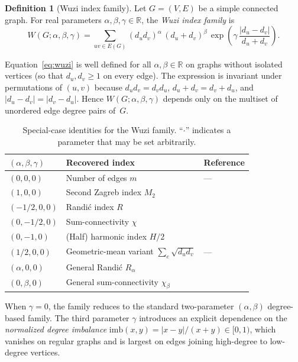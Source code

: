 \documentclass[11pt,a4paper]{article}
\theoremstyle{definition}
\newtheorem{definition}[theorem]{Definition}
\newcommand{\Wuzi}{W(G;\alpha,\beta,\gamma)}
\begin{document}
\begin{definition}[Wuzi index family]\label{def:wuzi}
Let $G=(V,E)$ be a simple connected graph. For real parameters
$\alpha,\beta,\gamma\in\mathbb{R}$, the \emph{Wuzi index family}
is
\begin{equation}\label{eq:wuzi}
\Wuzi
=\sum_{uv\in E(G)}
(d_u d_v)^{\alpha}\,(d_u+d_v)^{\beta}\,
\exp\!\left(\gamma\,\frac{|d_u-d_v|}{d_u+d_v}\right).
\end{equation}
\end{definition}

Equation~\eqref{eq:wuzi} is well defined for all $\alpha,\beta\in\mathbb{R}$
on graphs without isolated vertices (so that $d_u,d_v\ge 1$ on every
edge). The expression is invariant under permutations of $(u,v)$
because $d_u d_v=d_v d_u$, $d_u+d_v=d_v+d_u$, and
$|d_u-d_v|=|d_v-d_u|$. Hence $\Wuzi$ depends only on the multiset of
unordered edge degree pairs of~$G$.

\begin{table}[h]
\centering
\caption{Special-case identities for the Wuzi family. ``$\cdot$'' indicates a parameter that may be set arbitrarily.}
\label{tab:specialcases}
\begin{tabular}{lll}
\toprule
$(\alpha,\beta,\gamma)$ & Recovered index & Reference\\
\midrule
$(0,0,0)$ & Number of edges $m$ & ---\\
$(1,0,0)$ & Second Zagreb index $M_2$ & \cite{Gutman1972}\\
$(-1/2,0,0)$ & Randi\'c index $R$ & \cite{Randic1975}\\
$(0,-1/2,0)$ & Sum-connectivity $\chi$ & \cite{ZhouTrinajstic2009sumconn}\\
$(0,-1,0)$ & (Half) harmonic index $H/2$ & \cite{Fajtlowicz1987Harmonic}\\
$(1/2,0,0)$ & Geometric-mean variant $\sum_e\sqrt{d_ud_v}$ & ---\\
$(\alpha,0,0)$ & General Randi\'c $R_\alpha$ & \cite{BollobasErdos1998}\\
$(0,\beta,0)$ & General sum-connectivity $\chi_\beta$ & \cite{ZhouTrinajstic2009sumconn}\\
\bottomrule
\end{tabular}
\end{table}

When $\gamma=0$, the family reduces to the standard two-parameter
$(\alpha,\beta)$ degree-based family. The third parameter
$\gamma$ introduces an explicit dependence on the
\emph{normalized degree imbalance}
\(\mathrm{imb}(x,y)=|x-y|/(x+y)\in[0,1)\),
which vanishes on regular graphs and is largest on edges joining
high-degree to low-degree vertices.
\end{document}

